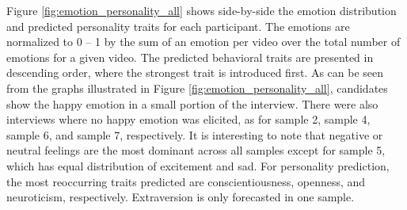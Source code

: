 Figure \ref{fig:emotion_personality_all} shows side-by-side the emotion distribution and predicted personality traits for each participant. The emotions are normalized to 0 -- 1 by the sum of an emotion per video over the total number of emotions for a given video. The predicted behavioral traits are presented in descending order, where the strongest trait is introduced first. As can be seen from the graphs illustrated in Figure \ref{fig:emotion_personality_all}, candidates show the happy emotion in a small portion of the interview. There were also interviews where no happy emotion was elicited, as for sample 2, sample 4, sample 6, and sample 7, respectively. It is interesting to note that negative or neutral feelings are the most dominant across all samples except for sample 5, which has equal distribution of excitement and sad. For personality prediction, the most reoccurring traits predicted are conscientiousness, openness, and neuroticism, respectively. Extraversion is only forecasted in one sample. 
\newpage
